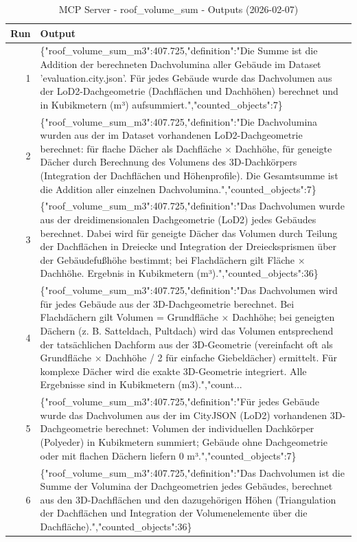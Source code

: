 \documentclass[a4paper,11pt]{article}
\begin{document}
\begin{table}[ht]
\centering
\scriptsize
\caption{MCP Server - roof\_volume\_sum - Outputs (2026-02-07)}
\label{tab:mcp\_roof\_volume\_sum\_outputs\_2026-02-07}
\begin{tabular}{r p{12cm}}
\hline
Run & Output \\
\hline
1 & \{"roof\_volume\_sum\_m3":407.725,"definition":"Die Summe ist die Addition der berechneten Dachvolumina aller Gebäude im Dataset 'evaluation.city.json'. Für jedes Gebäude wurde das Dachvolumen aus der LoD2-Dachgeometrie (Dachflächen und Dachhöhen) berechnet und in Kubikmetern (m³) aufsummiert.","counted\_objects":7\} \\
2 & \{"roof\_volume\_sum\_m3":407.725,"definition":"Die Dachvolumina wurden aus der im Dataset vorhandenen LoD2-Dachgeometrie berechnet: für flache Dächer als Dachfläche × Dachhöhe, für geneigte Dächer durch Berechnung des Volumens des 3D-Dachkörpers (Integration der Dachflächen und Höhenprofile). Die Gesamtsumme ist die Addition aller einzelnen Dachvolumina.","counted\_objects":7\} \\
3 & \{"roof\_volume\_sum\_m3":407.725,"definition":"Das Dachvolumen wurde aus der dreidimensionalen Dachgeometrie (LoD2) jedes Gebäudes berechnet. Dabei wird für geneigte Dächer das Volumen durch Teilung der Dachflächen in Dreiecke und Integration der Dreiecksprismen über der Gebäudefußhöhe bestimmt; bei Flachdächern gilt Fläche × Dachhöhe. Ergebnis in Kubikmetern (m³).","counted\_objects":36\} \\
4 & \{"roof\_volume\_sum\_m3":407.725,"definition":"Das Dachvolumen wird für jedes Gebäude aus der 3D-Dachgeometrie berechnet. Bei Flachdächern gilt Volumen = Grundfläche × Dachhöhe; bei geneigten Dächern (z. B. Satteldach, Pultdach) wird das Volumen entsprechend der tatsächlichen Dachform aus der 3D-Geometrie (vereinfacht oft als Grundfläche × Dachhöhe / 2 für einfache Giebeldächer) ermittelt. Für komplexe Dächer wird die exakte 3D-Geometrie integriert. Alle Ergebnisse sind in Kubikmetern (m3).","count... \\
5 & \{"roof\_volume\_sum\_m3":407.725,"definition":"Für jedes Gebäude wurde das Dachvolumen aus der im CityJSON (LoD2) vorhandenen 3D-Dachgeometrie berechnet: Volumen der individuellen Dachkörper (Polyeder) in Kubikmetern summiert; Gebäude ohne Dachgeometrie oder mit flachen Dächern liefern 0 m³.","counted\_objects":7\} \\
6 & \{"roof\_volume\_sum\_m3":407.725,"definition":"Das Dachvolumen ist die Summe der Volumina der Dachgeometrien jedes Gebäudes, berechnet aus den 3D-Dachflächen und den dazugehörigen Höhen (Triangulation der Dachflächen und Integration der Volumenelemente über die Dachfläche).","counted\_objects":36\} \\

\end{tabular}
\end{table}
\end{document}
